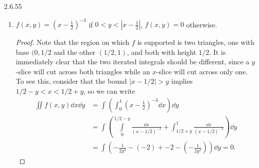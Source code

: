 \documentclass[11pt]{article}
\begin{document}
\begin{problem}{2.6.55}
\begin{enumerate}[label=\alph*.]
\begin{proof}
\begin{itemize}
\begin{equation}
                  \frac{-(1-y)^{1-a}}{1-a},
                \end{equation}
                  so we would need \( \int\limits_0^1 (1-y)^{1-a} \dd{y} < \infty \).
                  \begin{equation}
                  \label{eq:10}
                  \begin{aligned}
                    \int\limits_0^1 (1-y)^{1-a} \dd{y} = -\frac{(1-y)^{2-a}}{2-a} \eval_0^{1}.
                  \end{aligned}
                \end{equation}
                  If \( a < 2 \), then this clearly equals \( 0 \).
                  However, if \( a \geq 2 \), the numerator tends to \( \infty \) as \( y \rightarrow 1^- \).
                  Therefore, this region is integrable if and only if \( a < 2 \).
          \end{itemize}

          This shows that all three integrals are finite and equal for \( 0 < a < 2 \), and diverge to \( \infty \) for \( a \geq 2 \).
          \end{proof}
    \item \( f(x,y) = (x - \frac{1}{2})^{-3} \) if \( 0 < y < |x - \frac{1}{2}| \), \( f(x,y) = 0 \) otherwise.
          \begin{proof}
            Note that the region on which \( f \) is supported is two triangles, one with base \( (0,1/2 \) and the other \( (1/2,1) \), and both with height \( 1/2 \).
            It is immediately clear that the two iterated integrals should be different, since a \( y \)-slice will cut across both triangles while an \( x \)-slice will cut across only one.
            To see this, consider that the bound \( |x- 1/2| > y \) implies \( 1/2-y < x < 1/2 + y \), so we can write
            \begin{equation}
            \label{eq:13}
            \begin{aligned}
              \iint f(x,y) \dd{x}\dd{y} &= \int_{} \left( \int_{0}^{1} (x- \frac{1}{2})^{-3} \dd{x} \right) \dd{y} \\
              &= \int \left(\int\limits_0^{1/2 - y} \frac{\dd{x}}{(x-1/2)^{-3}} + \int_{1/2 + y}^1 \frac{\dd{x}}{(x-1/2)^{-3}} \right )\dd{y}\\
              &= \int \left( - \frac{1}{2y^2} - (-2) + -2 - (- \frac{1}{2y^2}) \right) \dd{y} = 0.
            \end{aligned}
          \end{equation}


\end{proof}
\end{enumerate}
\end{problem}
\end{document}
